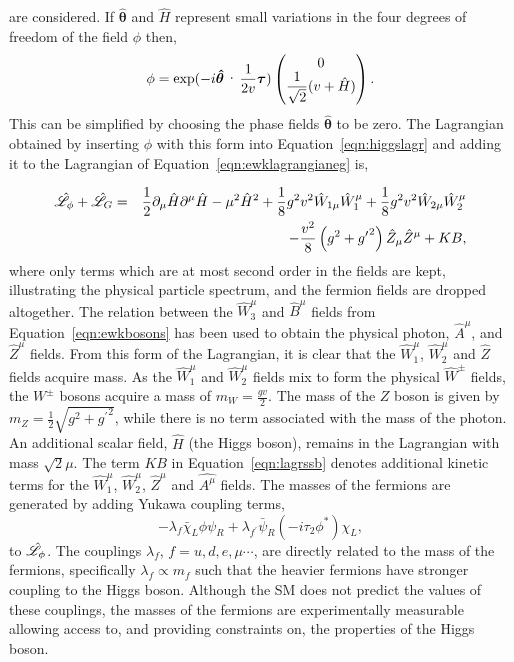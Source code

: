 are considered. If $\boldsymbol{\hat{\theta}}$ and $\hat{H}$ represent small variations in 
the four degrees of freedom of the field $\phi$ then, 
\begin{equation}
\phi = \exp(-i\boldsymbol{\hat{\theta}}\cdot\frac{1}{2v}\boldsymbol{\tau}) 
\everymath{\displaystyle} \begin{pmatrix}
0 \\ 
\frac{1}{\sqrt{2}}(v+\hat{H})
\end{pmatrix}.
\end{equation}
This can be simplified by choosing the phase fields $\boldsymbol{\hat{\theta}}$ 
to be zero. The Lagrangian obtained by inserting $\phi$ with this form 
into Equation~\ref{eqn:higgslagr} and adding it to the Lagrangian of 
Equation~\ref{eqn:ewklagrangianeg} is,

\begin{eqnarray}
\hat{\mathscr{L}}_{\phi}+\hat{\mathscr{L}}_{G} 
	     & = &   \frac{1}{2} \partial_{\mu} \hat{H} \partial^{\mu} \hat{H} 
	     - \mu^{2} \hat{H}^{2} 
	     + \frac{1}{8} g^{2}v^{2}\hat{W}_{1\mu}\hat{W}_{1}^{\mu}
	     + \frac{1}{8} g^{2}v^{2}\hat{W}_{2\mu}\hat{W}_{2}^{\mu}	
\nonumber \\
	    & & - \frac{v^{2}}{8} \left(g^{2}+{g^{\prime}}^{2}\right)\hat{Z}_{\mu}\hat{Z}^{\mu}
	     + KB ,
\label{eqn:lagrssb}
\end{eqnarray}
where only terms which are at most second order in the fields are kept, illustrating the physical 
particle spectrum, and the 
fermion fields are dropped altogether. 
The relation between the $\hat{W}^{\mu}_{3}$ 
and $\hat{B}^{\mu}$ fields from Equation~\ref{eqn:ewkbosons} has been used to obtain
the physical photon, $\hat{A}^{\mu}$, and $\hat{Z}^{\mu}$ 
fields. 
From this form of the Lagrangian, it is clear that the $\hat{W}_{1}^{\mu}$,  
$\hat{W}^{\mu}_{2}$ and $\hat{Z}$ fields acquire mass. As the $\hat{W}_{1}^{\mu}$ and 
$\hat{W}^{\mu}_{2}$ fields mix to form the physical $\hat{W}^{\pm}$ fields, 
the $W^{\pm}$ bosons acquire a mass of $m_{W} = \frac{\displaystyle gv}{\displaystyle 2}$.
The mass of the $Z$ boson is given by 
$m_{Z}=\frac{\displaystyle 1}{\displaystyle 2}\sqrt{g^{2}+{g^{\prime}}^{2}}$, 
while there is no term associated with the mass of the photon.
An additional scalar field, $\hat{H}$ (the Higgs boson), 
remains in the Lagrangian with mass $\sqrt{2}\mu$. 
The term $KB$ in Equation~\ref{eqn:lagrssb} denotes additional kinetic terms for the $\hat{W}^{\mu}_{1}$, 
$\hat{W}^{\mu}_{2}$, $\hat{Z}^{\mu}$ and $\hat{A^{\mu}}$ fields. 
The masses of the fermions are generated by adding Yukawa coupling
terms,
\begin{equation} 
-\lambda_{f} \bar{\chi}_{L} \phi \psi_{R} + \lambda_{f^{\prime}}\bar{\psi}_{R}(-i\tau_{2}\phi^{*})\chi_{L},
\end{equation}
to $\hat{\mathscr{L}}_{\phi}$. 
The couplings $\lambda_{f}$, $f=u,d,e,\mu\cdots$,  are directly related
to the mass of the fermions, specifically 
$\lambda_{f}\propto m_{f}$ such that the heavier fermions have stronger
coupling to the Higgs boson. Although the SM does not predict the values of these
couplings, the masses of the fermions are experimentally measurable allowing 
access to, and providing constraints on, the properties of the Higgs boson.

